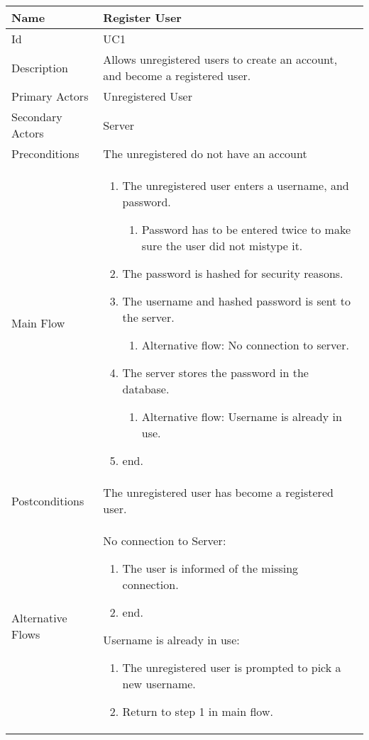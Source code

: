 
\begin{tabularx}{\textwidth}{|l|X|}
\hline
Name              & Register User \\ \hline 
Id                & UC1 \\ \hline
Description       & Allows unregistered users to create an account, and become a registered user.\\ \hline
Primary Actors    & Unregistered User \\ \hline
Secondary Actors  & Server \\ \hline
Preconditions     & The unregistered do not have an account \\ \hline
Main Flow         & {\footnotesize \begin{enumerate}
\item The unregistered user enters a username, and password.
\begin{enumerate}
\item Password has to be entered twice to make sure the user did not mistype it.
\end{enumerate}
\item The password is hashed for security reasons.
\item The username and hashed password is sent to the server.
\begin{enumerate}
\item Alternative flow: No connection to server.
\end{enumerate}
\item The server stores the password in the database.
\begin{enumerate}
\item Alternative flow: Username is already in use.
\end{enumerate}
\item end.
\end{enumerate}} \\ \hline
Postconditions    & The unregistered user has become a registered user. \\ \hline
Alternative Flows & 
No connection to Server:
{\footnotesize \begin{enumerate}
\item The user is informed of the missing connection.
\item end.
\end{enumerate}}
Username is already in use:
{\footnotesize \begin{enumerate}
\item The unregistered user is prompted to pick a new username.
\item Return to step 1 in main flow.
\end{enumerate}}
\\ \hline
\end{tabularx}

